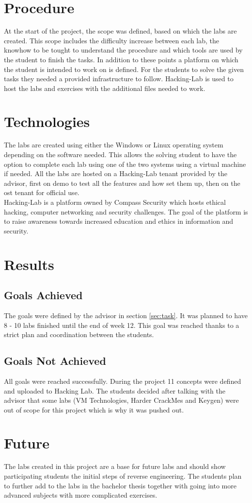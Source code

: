 \section{Procedure}
At the start of the project, the scope was defined, based on which the labs are created. This scope includes the difficulty increase between each lab, the knowhow to be tought to understand the procedure and which tools are used by the student to finish the tasks. In addition to these points a platform on which the student is intended to work on is defined.
For the students to solve the given tasks they needed a provided infrastructure to follow. Hacking-Lab is used to host the labs and exercises with the additional files needed to work.

\section{Technologies}
The labs are created using either the Windows or Linux operating system depending on the software needed. This allows the solving student to have the option to complete each lab using one of the two systems using a virtual machine if needed. 
All the labs are hosted on a Hacking-Lab tenant provided by the advisor, first on demo to test all the features and how set them up, then on the ost tenant for official use. \\
Hacking-Lab is a platform owned by Compass Security which hosts ethical hacking, computer networking and security challenges. The goal of the platform is to raise awareness towards increased education and ethics in information and security. 

\section{Results}
\subsection{Goals Achieved}
The goals were defined by the advisor in section \ref{sec:task}. It was planned to have 8 - 10 labs finished until the end of week 12. This goal was reached thanks to a strict plan and coordination between the students.

\subsection{Goals Not Achieved}
All goals were reached successfully. During the project 11 concepts were defined and uploaded to Hacking Lab. The students decided after talking with the advisor that some labs (VM Technologies, Harder CrackMes and Keygen) were out of scope for this project which is why it was pushed out. 

\section{Future}
The labs created in this project are a base for future labs and should show participating students the initial steps of reverse engineering. The students plan to further add to the labs in the bachelor thesis together with going into more advanced subjects with more complicated exercises. 
